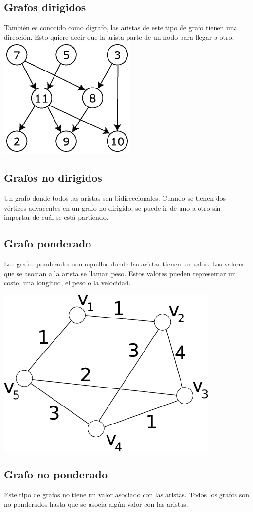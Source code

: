 \documentclass[twocolumn]{article}
\begin{document}
\subsection{Grafos dirigidos}
También es conocido como dígrafo, las aristas de este tipo de grafo tienen una dirección. Esto quiere decir que la arista parte de un nodo para llegar a otro.
\includegraphics[width = .45\textwidth]{imagenes/dirigido.png}
\subsection{Grafos no dirigidos}
Un grafo donde todos las aristas son bidireccionales. Cuando se tienen dos vértices adyacentes en un grafo no dirigido, se puede ir de uno a otro sin importar de cuál se está partiendo.

\subsection{Grafo ponderado}
Los grafos ponderados son aquellos donde las aristas tienen un valor. Los valores que se asocian a la arista se llaman peso. Estos valores pueden representar un costo, una longitud, el peso o la velocidad.
\cite{upgrad}

\includegraphics[width = .45\textwidth]{imagenes/ponderado.png}


\subsection{Grafo no ponderado}
Este tipo de grafos no tiene un valor asociado con las aristas. Todos los grafos son no ponderados hasta que se asocia algún valor con las aristas.
\end{document}
